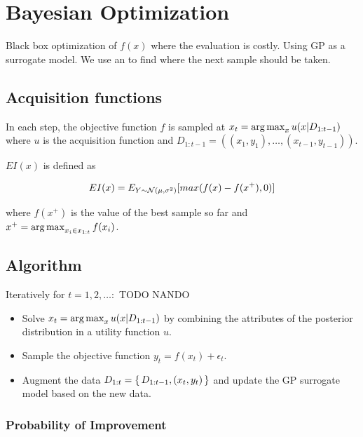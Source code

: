 \chapter{Bayesian Optimization}

Black box optimization of $f(x)$ where the evaluation is costly. Using GP as a surrogate model. We use an  to find where the next sample should be taken.

\section{Acquisition functions}

In each step, the objective function $f$ is sampled at $x_t = \operatorname*{arg\,max}_x u(x|D_{1:t-1})$ where $u$ is the acquisition function and $D_{1:t-1} = ((x_1,y_1),\ldots,(x_{t-1},y_{t-1}))$.

\begin{defn}
     $EI(x)$ is defined as
    
    \begin{equation}
        EI(x) = E_{Y \sim {\mathcal{N}}(\mu, \sigma^2)} [max(f(x) - f(x^+), 0)]
    \end{equation}
    
    where $f(x^+)$ is the value of the best sample so far and $x^+ = \operatorname*{arg\,max}_{x_i \in x_{1:t}} f(x_i)$.
\end{defn}

\section{Algorithm}

Iteratively for $t = 1,2,\ldots:$ {TODO NANDO}

\begin{itemize}
    \item Solve $x_t = \operatorname*{arg\,max}_x u(x|D_{1:t-1})$ by combining the attributes of the posterior distribution in a utility function $u$.
    \item Sample the objective function $y_t = f(x_t) + \epsilon_t$.
    \item Augment the data $D_{1:t} = \set{D_{1:t-1}, (x_t, y_t)}$ and update the GP surrogate model based on the new data.
\end{itemize}


\subsection{Probability of Improvement}

